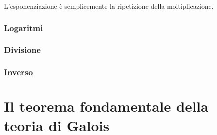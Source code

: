 \textsf{\small L'esponenziazione è semplicemente la ripetizione della moltiplicazione.}




\subsubsection{Logaritmi}



\subsubsection{Divisione}

\textsf{\small }

\subsubsection{Inverso}

\textsf{\small }


\section{Il teorema fondamentale della teoria di Galois} %
\textsf{\small } 

